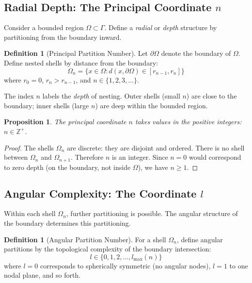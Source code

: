 \documentclass[twocolumn,10pt,a4paper]{article}
\newtheorem{proposition}[theorem]{Proposition}
\theoremstyle{definition}
\newtheorem{definition}[theorem]{Definition}
\theoremstyle{remark}
\begin{document}
\subsection{Radial Depth: The Principal Coordinate $n$}

Consider a bounded region $\Omega \subset \Gamma$. Define a \emph{radial} or \emph{depth} structure by partitioning from the boundary inward.

\begin{definition}[Principal Partition Number]
Let $\partial\Omega$ denote the boundary of $\Omega$. Define nested shells by distance from the boundary:
\begin{equation}
    \Omega_n = \{x \in \Omega : d(x, \partial\Omega) \in [r_{n-1}, r_n]\}
\end{equation}
where $r_0 = 0$, $r_n > r_{n-1}$, and $n \in \{1, 2, 3, \ldots\}$.
\end{definition}

The index $n$ labels the \emph{depth} of nesting. Outer shells (small $n$) are close to the boundary; inner shells (large $n$) are deep within the bounded region.

\begin{proposition}
The principal coordinate $n$ takes values in the positive integers: $n \in \mathbb{Z}^+$.
\end{proposition}

\begin{proof}
The shells $\Omega_n$ are discrete: they are disjoint and ordered. There is no shell between $\Omega_n$ and $\Omega_{n+1}$. Therefore $n$ is an integer. Since $n = 0$ would correspond to zero depth (on the boundary, not inside $\Omega$), we have $n \geq 1$.
\end{proof}

\subsection{Angular Complexity: The Coordinate $l$}

Within each shell $\Omega_n$, further partitioning is possible. The angular structure of the boundary determines this partitioning.

\begin{definition}[Angular Partition Number]
For a shell $\Omega_n$, define angular partitions by the topological complexity of the boundary intersection:
\begin{equation}
    l \in \{0, 1, 2, \ldots, l_{\max}(n)\}
\end{equation}
where $l = 0$ corresponds to spherically symmetric (no angular nodes), $l = 1$ to one nodal plane, and so forth.
\end{definition}
\end{document}
